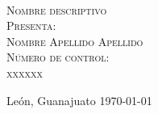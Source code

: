\begin{titlepage}
\begin{minipage}[c][0.81\textheight][t]{0.75\textwidth}
\begin{center}
      {\color{black}{\large\scshape Informe Técnico de Residencia Profesional}}\\[.2in]

      \vspace{1cm}            

      \textsc{\LARGE Nombre descriptivo}\\[2.5cm] %
    
      {\color{black}\textsc{\large Presenta:}}\\[0.5cm]
      \textsc{\large {Nombre Apellido Apellido }}\\[0.5cm]          
      {\color{black}\textsc{\large Número de control:}}\\[0.5cm]
	  \textsc{\large {xxxxxx}}\\[2.5cm]

%
%
%

      \vspace{1.5cm}
       
      \large{Le\'on, Guanajuato \hspace*{3cm} \today}
    \end{center}
  \end{minipage}
\end{titlepage}
